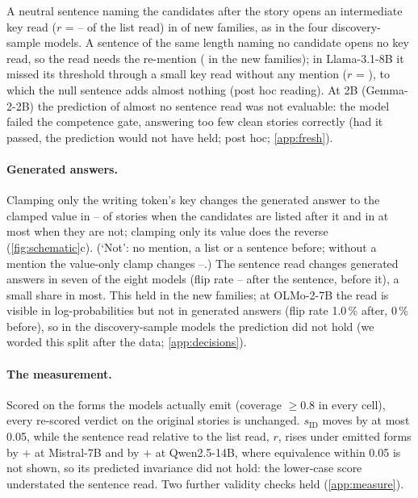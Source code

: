 A neutral sentence naming the candidates after the story opens an intermediate key read ($r$ = \JbRangeRPostNfourMin--\JbRangeRPostNfourMax{} of the list read) in \JbThreeNfMet{} of \JbThreeNfEval{} new families\rsk, as in the four discovery-sample models. A sentence of the same length naming no candidate opens no key read, so the read needs the re-mention (\rsk{} in the new families); in Llama-3.1-8B it missed its threshold through a small key read without any mention ($r$ = \JbRNoneLlamaEight{}), to which the null sentence adds almost nothing (post hoc reading). At 2B (Gemma-2-2B) the prediction\rsk{} of almost no sentence read was not evaluable: the model failed the competence gate, answering too few clean stories correctly (had it passed, the prediction would not have held; post hoc; \cref{app:fresh}).

\paragraph{Generated answers.}
Clamping only the writing token's key changes the generated answer to the clamped value in \pctn{\JbRangeBetaKAfterEightMin}--\pct{\JbRangeBetaKAfterEightMax} of stories when the candidates are listed after it and in at most \pct{\JbRangeBetaKNoneEightMax} when they are not; clamping only its value does the reverse (\cref{fig:schematic}c). (`Not': no mention, a list or a sentence before; without a mention the value-only clamp changes \pctn{\JbRangeBetaVNoneEightMin}--\pct{\JbRangeBetaVNoneEightMax}.) The sentence read changes generated answers\rsk{} in seven of the eight models (flip rate \pctn{\JbFivebFlipPostMetMin}--\pct{\JbFivebFlipPostMetMax} after the sentence, \pct{\JbRangeFlipPreEightMax} before it), a small share in most. This held in the new families; at OLMo-2-7B the read is visible in log-probabilities but not in generated answers (flip rate 1.0\,\% after, 0\,\% before), so in the discovery-sample models the prediction did not hold (we worded this split after the data; \cref{app:decisions}). %

\paragraph{The measurement.}
Scored on the forms the models actually emit (coverage $\geq 0.8$ in every cell), every re-scored verdict on the original stories is unchanged\rsk. $s_{\mathrm{ID}}$ moves by at most 0.05, while the sentence read relative to the list read, $r$, rises under emitted forms by $+$\JbSixbRPostMistralSeven{} at Mistral-7B and by $+$\JbSixbRPostQwenFourteen{} at Qwen2.5-14B, where equivalence within 0.05 is not shown, so its predicted invariance did not hold\rsk: the lower-case score understated the sentence read. Two further validity checks held\rsk{} (\cref{app:measure}).

